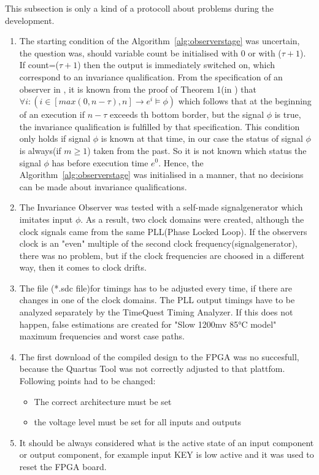 This subsection is only a kind of a protocoll about problems during the development. 
\begin{enumerate}
\item The starting condition of the Algorithm~\ref{alg:observerstage} was uncertain, the question was, should variable
count be initialised with 0 or with ($\tau + 1$). If count=($\tau + 1$) then the output is immediately switched on, which
correspond to an invariance qualification. From the specification of an observer in \cite{RTFMBJ13}, it is known from
the proof of Theorem 1(in \cite{RTFMBJ13}) that $\forall i:(i \in [max(0,n-\tau),n] \rightarrow e^i \models \phi)$ which follows 
that at the beginning of an execution if $n-\tau$ exceeds th bottom border, but the signal $\phi$ is true, the invariance qualification
is fulfilled by that specification. 
This condition only holds if signal $\phi$ is known at that time, in our case the status of signal $\phi$ is always(if $m \ge 1$) taken from the past. 
So it is not known which status the signal $\phi$ has before execution time $e^0$. Hence, the Algorithm~\ref{alg:observerstage} was initialised in a manner, that
no decisions can be made about invariance qualifications. 
\item The Invariance Observer was tested with a  self-made signalgenerator which imitates input $\phi$. As a result, two clock domains were created, although the clock signals
came from the same PLL(Phase Locked Loop). If the observers clock is an "even" multiple of the second clock frequency(signalgenerator), there was no problem, but if the clock frequencies are choosed in a different way, then
it comes to clock drifts. 
\item The file (*.sdc file)for timings has to be adjusted every time, if there are changes in one of the clock domains. The PLL output timings have to be analyzed separately by the
TimeQuest Timing Analyzer. If this does not happen, false estimations are created for "Slow 1200mv 85°C model" maximum frequencies and worst case paths. 
\item The first download of the compiled design to the FPGA was no succesfull, because the Quartus Tool was not correctly adjusted to that plattfom. 
Following points had to be changed:
\begin{itemize}
\item The correct architecture must be set
\item the voltage level must be set for all inputs and outputs
\end{itemize}
\item It should be always considered what is the active state of an input component or output component, for example
input KEY is low active and it was used to reset the FPGA board. 
\end{enumerate} 
